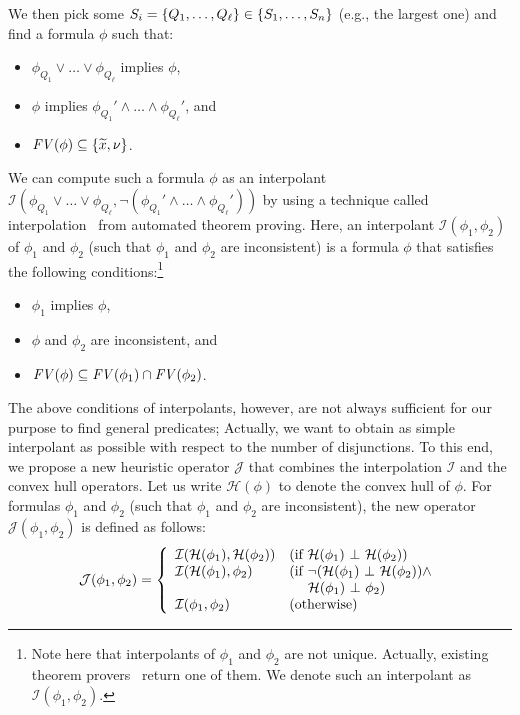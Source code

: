 We then pick some \(S_i = \{{Q_1,\dots,Q_{\ell}}\} \in 
\{{S_1,\dots,S_n}\}\) (e.g., the largest one) and find a formula \(\phi\) 
such that:
\begin{itemize}
\item \(\phi_{Q_1} \lor \dots \lor \phi_{Q_{\ell}}\) implies \(\phi\),
\item \(\phi\) implies \(\phi_{Q_1}' \land \dots \land \phi_{Q_{\ell}}'\), and
\item \(\mathit{FV}({\phi}) \subseteq \{{\widetilde{x},\nu}\}\).
\end{itemize}
We can compute such a formula \(\phi\) as an interpolant 
\(\mathcal{I}(\phi_{Q_1} \lor \dots \lor \phi_{Q_{\ell}},\neg 
(\phi_{Q_1}' \land \dots \land \phi_{Q_{\ell}}'))\) by using a technique 
called interpolation~\cite{Henzinger2004,McMillan2005} from automated 
theorem proving.  Here, an interpolant \(\mathcal{I}(\phi_1,\phi_2)\) of 
\(\phi_1\) and \(\phi_2\) (such that \(\phi_1\) and \(\phi_2\) are 
inconsistent) is a formula \(\phi\) that satisfies the following 
conditions:\footnote{Note here that interpolants of \(\phi_1\) and 
\(\phi_2\) are not unique.  Actually, existing theorem 
provers~\cite{Henzinger2004,McMillan2005,Beyer2008} return one of them.  
We denote such an interpolant as \(\mathcal{I}(\phi_1,\phi_2)\).}
\begin{itemize}
\item \(\phi_1\) implies \(\phi\),
\item \(\phi\) and \(\phi_2\) are inconsistent, and
\item \(\mathit{FV}({\phi}) \subseteq \mathit{FV}({\phi_1}) \cap \mathit{FV}({\phi_2})\).
\end{itemize}
The above conditions of interpolants, however, are not always sufficient 
for our purpose to find general predicates;  Actually, we want to obtain 
as simple interpolant as possible with respect to the number of 
disjunctions.
To this end, we propose a new heuristic operator \(\mathcal{J}\) that 
combines the interpolation \(\mathcal{I}\) and the convex hull operators. 
 Let us write \(\mathcal{H}(\phi)\) to denote the convex hull of \(\phi\). 
 For formulas \(\phi_1\) and \(\phi_2\) (such that \(\phi_1\) and 
\(\phi_2\) are inconsistent), the new operator 
\(\mathcal{J}(\phi_1,\phi_2)\) is defined as follows:
\begin{eqnarray*}
\mathcal{J}(\phi_1,\phi_2) =
\left\{
\begin{array}{ll}
\mathcal{I}(\mathcal{H}(\phi_1),\mathcal{H}(\phi_2)) & (\mbox{if~}\mathcal{H}(\phi_1) \ \bot\  \mathcal{H}(\phi_2)) \\
\mathcal{I}(\mathcal{H}(\phi_1),\phi_2) & (\mbox{if~}\neg (\mathcal{H}(\phi_1) \ \bot\  \mathcal{H}(\phi_2)) \land \\
&\ \quad \mathcal{H}(\phi_1) \ \bot\  \phi_2) \\
\mathcal{I}(\phi_1,\phi_2) & (\mbox{otherwise})
\end{array}
\right.
\end{eqnarray*}
